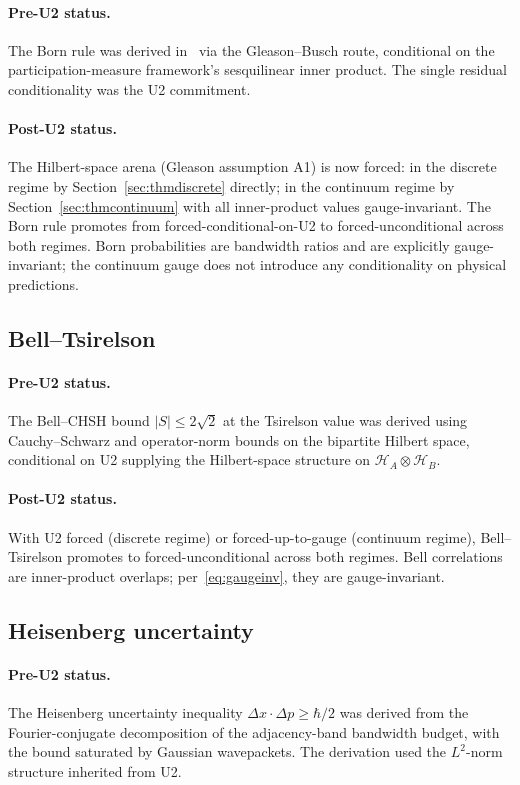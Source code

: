 \documentclass[11pt,a4paper]{article}
\begin{document}
\paragraph{Pre-U2 status.} The Born rule was derived in~\cite{borngleason} via the Gleason--Busch route, conditional on the participation-measure framework's sesquilinear inner product. The single residual conditionality was the U2 commitment.

\paragraph{Post-U2 status.} The Hilbert-space arena (Gleason assumption A1) is now forced: in the discrete regime by Section~\ref{sec:thmdiscrete} directly; in the continuum regime by Section~\ref{sec:thmcontinuum} with all inner-product values gauge-invariant. The Born rule promotes from forced-conditional-on-U2 to forced-unconditional across both regimes. Born probabilities are bandwidth ratios and are explicitly gauge-invariant; the continuum gauge does not introduce any conditionality on physical predictions.

\subsection{Bell--Tsirelson}

\paragraph{Pre-U2 status.} The Bell--CHSH bound $|S| \leq 2\sqrt{2}$ at the Tsirelson value was derived using Cauchy--Schwarz and operator-norm bounds on the bipartite Hilbert space, conditional on U2 supplying the Hilbert-space structure on $\mathcal{H}_A \otimes \mathcal{H}_B$.

\paragraph{Post-U2 status.} With U2 forced (discrete regime) or forced-up-to-gauge (continuum regime), Bell--Tsirelson promotes to forced-unconditional across both regimes. Bell correlations are inner-product overlaps; per~\eqref{eq:gaugeinv}, they are gauge-invariant.

\subsection{Heisenberg uncertainty}

\paragraph{Pre-U2 status.} The Heisenberg uncertainty inequality $\Delta x \cdot \Delta p \geq \hbar/2$ was derived from the Fourier-conjugate decomposition of the adjacency-band bandwidth budget, with the bound saturated by Gaussian wavepackets. The derivation used the $L^2$-norm structure inherited from U2.
\end{document}
